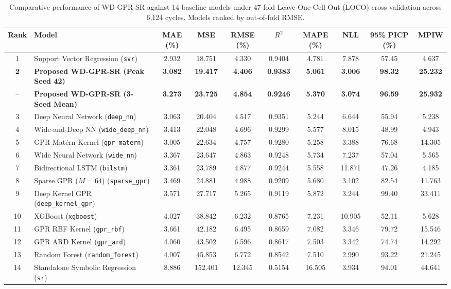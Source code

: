 \documentclass[a4paper,fleqn]{cas-sc}
\begin{document}
\begin{table}[pos=htbp]
\centering
\caption{Comparative performance of WD-GPR-SR against 14 baseline models under 47-fold Leave-One-Cell-Out (LOCO) cross-validation across 6,124 cycles. Models ranked by out-of-fold RMSE.}
\label{tab:baseline_comparison}
\footnotesize
\renewcommand{\arraystretch}{1.12}
\setlength{\tabcolsep}{2.8pt}
\begin{tabular*}{\textwidth}{@{\extracolsep{\fill}}clcccccccc@{}}
\toprule
\textbf{Rank} & \textbf{Model} & \textbf{MAE (\%)} & \textbf{MSE} & \textbf{RMSE (\%)} & \textbf{$R^2$} & \textbf{MAPE (\%)} & \textbf{NLL} & \textbf{95\% PICP (\%)} & \textbf{MPIW} \\
\midrule
1 & Support Vector Regression (\texttt{svr}) & 2.932 & 18.751 & 4.330 & 0.9404 & 4.781 & 7.878 & 57.45 & 4.637 \\
\textbf{2} & \textbf{Proposed WD-GPR-SR (Peak Seed 42)} & \textbf{3.082} & \textbf{19.417} & \textbf{4.406} & \textbf{0.9383} & \textbf{5.061} & \textbf{3.006} & \textbf{98.32} & \textbf{25.232} \\
-- & \textbf{Proposed WD-GPR-SR (3-Seed Mean)} & \textbf{3.273} & \textbf{23.725} & \textbf{4.854} & \textbf{0.9246} & \textbf{5.370} & \textbf{3.074} & \textbf{96.59} & \textbf{25.932} \\
3 & Deep Neural Network (\texttt{deep\_nn}) & 3.063 & 20.404 & 4.517 & 0.9351 & 5.244 & 6.644 & 55.94 & 5.238 \\
4 & Wide-and-Deep NN (\texttt{wide\_deep\_nn}) & 3.413 & 22.048 & 4.696 & 0.9299 & 5.577 & 8.015 & 48.99 & 4.943 \\
5 & GPR Matérn Kernel (\texttt{gpr\_matern}) & 3.005 & 22.634 & 4.757 & 0.9280 & 5.258 & 3.388 & 76.68 & 14.305 \\
6 & Wide Neural Network (\texttt{wide\_nn}) & 3.367 & 23.647 & 4.863 & 0.9248 & 5.734 & 7.237 & 57.04 & 5.565 \\
7 & Bidirectional LSTM (\texttt{bilstm}) & 3.361 & 23.789 & 4.877 & 0.9244 & 5.558 & 11.871 & 47.26 & 4.185 \\
8 & Sparse GPR ($M=64$) (\texttt{sparse\_gpr}) & 3.469 & 24.881 & 4.988 & 0.9209 & 5.680 & 3.102 & 82.54 & 11.763 \\
9 & Deep Kernel GPR (\texttt{deep\_kernel\_gpr}) & 3.571 & 27.717 & 5.265 & 0.9119 & 5.872 & 3.244 & 99.40 & 33.411 \\
10 & XGBoost (\texttt{xgboost}) & 4.027 & 38.842 & 6.232 & 0.8765 & 7.231 & 10.905 & 52.11 & 5.628 \\
11 & GPR RBF Kernel (\texttt{gpr\_rbf}) & 3.661 & 42.182 & 6.495 & 0.8659 & 7.082 & 3.346 & 79.72 & 15.546 \\
12 & GPR ARD Kernel (\texttt{gpr\_ard}) & 4.060 & 43.502 & 6.596 & 0.8617 & 7.503 & 3.342 & 74.74 & 14.292 \\
13 & Random Forest (\texttt{random\_forest}) & 4.007 & 45.853 & 6.772 & 0.8542 & 7.510 & 2.990 & 93.22 & 21.245 \\
14 & Standalone Symbolic Regression (\texttt{sr}) & 8.886 & 152.401 & 12.345 & 0.5154 & 16.505 & 3.934 & 94.01 & 44.641 \\
\bottomrule
\end{tabular*}
\end{table}
\end{document}
